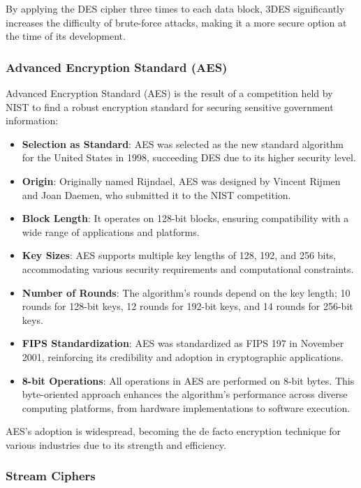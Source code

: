 \documentclass[12pt]{article}
\begin{document}
By applying the DES cipher three times to each data block, 3DES significantly increases the difficulty of brute-force attacks, making it a more secure option at the time of its development.

\subsubsection*{Advanced Encryption Standard (AES)}

Advanced Encryption Standard (AES) is the result of a competition held by NIST to find a robust encryption standard for securing sensitive government information:

\begin{itemize}
    \item \textbf{Selection as Standard}: AES was selected as the new standard algorithm for the United States in 1998, succeeding DES due to its higher security level.
    \item \textbf{Origin}: Originally named Rijndael, AES was designed by Vincent Rijmen and Joan Daemen, who submitted it to the NIST competition.
    \item \textbf{Block Length}: It operates on 128-bit blocks, ensuring compatibility with a wide range of applications and platforms.
    \item \textbf{Key Sizes}: AES supports multiple key lengths of 128, 192, and 256 bits, accommodating various security requirements and computational constraints.
    \item \textbf{Number of Rounds}: The algorithm's rounds depend on the key length; 10 rounds for 128-bit keys, 12 rounds for 192-bit keys, and 14 rounds for 256-bit keys.
    \item \textbf{FIPS Standardization}: AES was standardized as FIPS 197 in November 2001, reinforcing its credibility and adoption in cryptographic applications.
    \item \textbf{8-bit Operations}: All operations in AES are performed on 8-bit bytes. This byte-oriented approach enhances the algorithm's performance across diverse computing platforms, from hardware implementations to software execution.
\end{itemize}

AES's adoption is widespread, becoming the de facto encryption technique for various industries due to its strength and efficiency.


\subsubsection*{Stream Ciphers}
\end{document}

